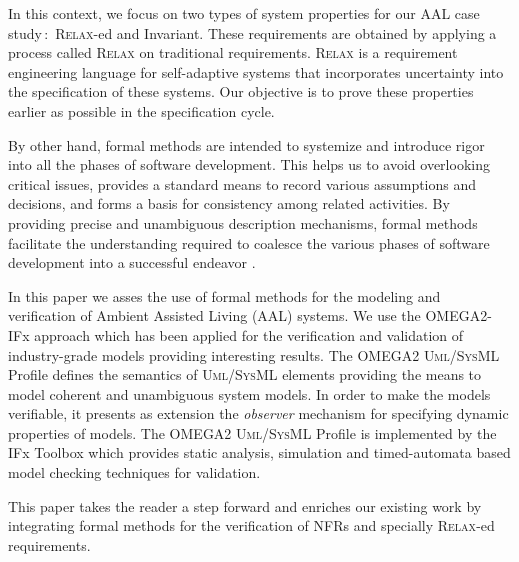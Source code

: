 \documentclass[a4paper,twoside]{article}
\def\myrelax{\textsc{Relax}}                  %
\def\UML{\textsc{Uml}}
\def\SysML{\textsc{SysML}}
\begin{document}
In this context, we focus on two types of system properties for our AAL case study\,:~\myrelax{}-ed and Invariant. These requirements are obtained by applying a process called  \myrelax{} \cite{test6} on traditional requirements. \myrelax{}  is  a  requirement  engineering language for self-adaptive systems that incorporates uncertainty into the specification of these systems. Our objective is to prove these properties earlier as possible in the specification cycle.

By other hand, formal methods are intended to systemize and introduce rigor into all the phases of software development. This helps us to avoid overlooking critical issues, provides a standard means to record various assumptions and decisions, and forms a basis for consistency among related activities. By providing precise and unambiguous description mechanisms, formal methods facilitate the understanding required to coalesce the various phases of software development into a successful endeavor \cite{test1}. 

In this paper we asses the use of formal methods for the modeling and verification of Ambient Assisted Living (AAL) systems. We use the OMEGA2-IFx approach which has been applied for the verification and validation of industry-grade models \cite{test2}  providing interesting results. The OMEGA2 \UML{}/\SysML{} Profile \cite{test3} defines the semantics of \UML{}/\SysML{} elements providing the means to model coherent and unambiguous system models. In order to make the models verifiable, it presents as extension the \textit{observer} mechanism for specifying dynamic properties of models. The OMEGA2 \UML{}/\SysML{} Profile is implemented by the IFx Toolbox \cite{test4} which provides static analysis, simulation and timed-automata based model checking \cite{test5} techniques for validation.

This paper takes the reader a step forward and enriches our existing work by integrating formal methods for the verification of NFRs and specially  \myrelax{}-ed requirements.

\end{document}
